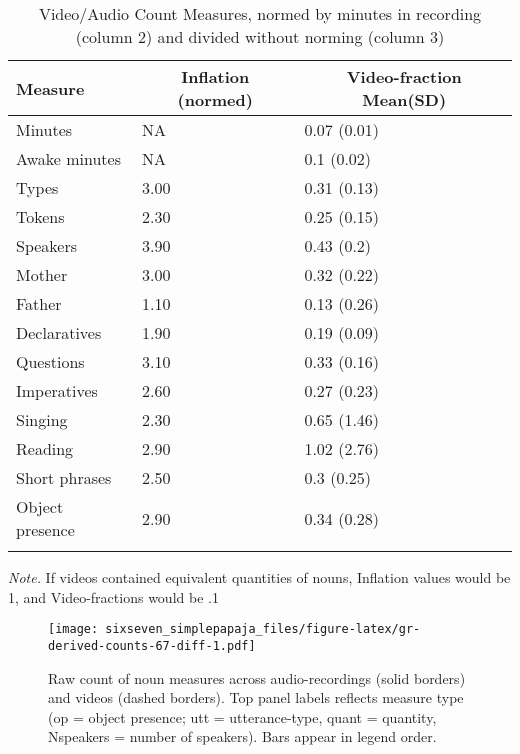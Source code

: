 \documentclass[man]{apa6}
\theoremstyle{definition}
\theoremstyle{definition}
\theoremstyle{definition}
\theoremstyle{remark}
\begin{document}
\begin{table}[tbp]
\begin{center}
\begin{threeparttable}
\caption{\label{tab:normtable}Video/Audio Count Measures, normed by minutes in recording (column 2) and divided without norming (column 3)}
\small{
\begin{tabular}{lll}
\toprule
Measure & \multicolumn{1}{c}{Inflation (normed)} & \multicolumn{1}{c}{Video-fraction Mean(SD)}\\
\midrule
Minutes & NA & 0.07 (0.01)\\
Awake minutes & NA & 0.1 (0.02)\\
Types & 3.00 & 0.31 (0.13)\\
Tokens & 2.30 & 0.25 (0.15)\\
Speakers & 3.90 & 0.43 (0.2)\\
Mother & 3.00 & 0.32 (0.22)\\
Father & 1.10 & 0.13 (0.26)\\
Declaratives & 1.90 & 0.19 (0.09)\\
Questions & 3.10 & 0.33 (0.16)\\
Imperatives & 2.60 & 0.27 (0.23)\\
Singing & 2.30 & 0.65 (1.46)\\
Reading & 2.90 & 1.02 (2.76)\\
Short phrases & 2.50 & 0.3 (0.25)\\
Object presence & 2.90 & 0.34 (0.28)\\
\bottomrule
\addlinespace
\end{tabular}
}
\begin{tablenotes}[para]
\textit{Note.} If videos contained equivalent quantities of nouns, Inflation values would be 1, and Video-fractions would be .1
\end{tablenotes}
\end{threeparttable}
\end{center}
\end{table}

\begin{figure}[htbp]
\centering
\texttt{[image: sixseven\_simplepapaja\_files/figure-latex/gr-derived-counts-67-diff-1.pdf]}
\caption{\label{fig:gr-derived-counts-67-diff}Raw count of noun measures
across audio-recordings (solid borders) and videos (dashed borders). Top
panel labels reflects measure type (op = object presence; utt =
utterance-type, quant = quantity, Nspeakers = number of speakers). Bars
appear in legend order.}
\end{figure}
\end{document}
